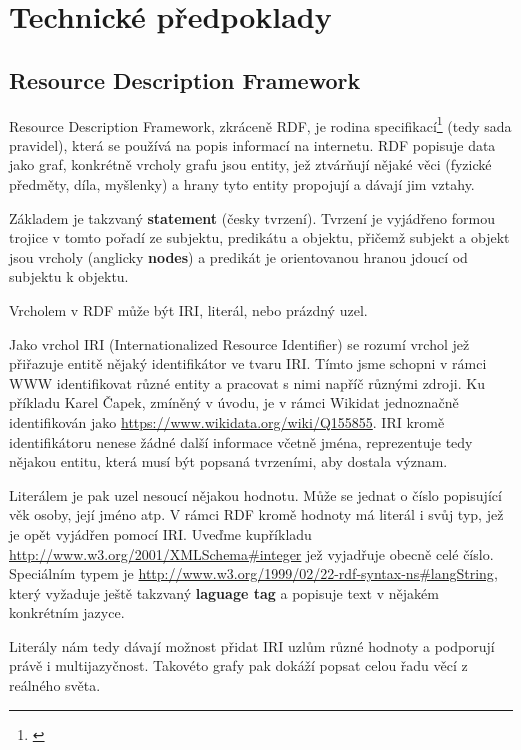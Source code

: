 \chapter{Technické předpoklady}

\section{Resource Description Framework}
Resource Description Framework, zkráceně RDF, je rodina specifikací\footnote{\citet{Raimond:14:RP}} (tedy sada pravidel), která se používá na popis informací na internetu. RDF popisuje data jako graf, konkrétně vrcholy grafu jsou entity, jež ztvárňují nějaké věci (fyzické předměty, díla, myšlenky) a hrany tyto entity propojují a dávají jim vztahy.

Základem je takzvaný \textbf{statement} (česky tvrzení). Tvrzení je vyjádřeno formou trojice v tomto pořadí ze subjektu, predikátu a objektu, přičemž subjekt a objekt jsou vrcholy (anglicky \textbf{nodes}) a predikát je orientovanou hranou jdoucí od subjektu k objektu.

Vrcholem v RDF může být IRI, literál, nebo prázdný uzel.

\medskip

Jako vrchol IRI (Internationalized Resource Identifier) se rozumí vrchol jež přiřazuje entitě nějaký identifikátor ve tvaru IRI. Tímto jsme schopni v rámci WWW identifikovat různé entity a pracovat s nimi napříč různými zdroji. Ku příkladu Karel Čapek, zmíněný v úvodu, je v rámci Wikidat jednoznačně identifikován jako \url{https://www.wikidata.org/wiki/Q155855}. IRI kromě identifikátoru nenese žádné další informace včetně jména, reprezentuje tedy nějakou entitu, která musí být popsaná tvrzeními, aby dostala význam.

\medskip

Literálem je pak uzel nesoucí nějakou hodnotu. Může se jednat o číslo popisující věk osoby, její jméno atp. V rámci RDF kromě hodnoty má literál i svůj typ, jež je opět vyjádřen pomocí IRI. Uveďme kupříkladu \url{http://www.w3.org/2001/XMLSchema#integer} jež vyjadřuje obecně celé číslo. Speciálním typem je \url{http://www.w3.org/1999/02/22-rdf-syntax-ns#langString}, který vyžaduje ještě takzvaný \textbf{laguage tag} a popisuje text v nějakém konkrétním jazyce.

\medskip

Literály nám tedy dávají možnost přidat IRI uzlům různé hodnoty a podporují právě i multijazyčnost. Takovéto grafy pak dokáží popsat celou řadu věcí z reálného světa.

